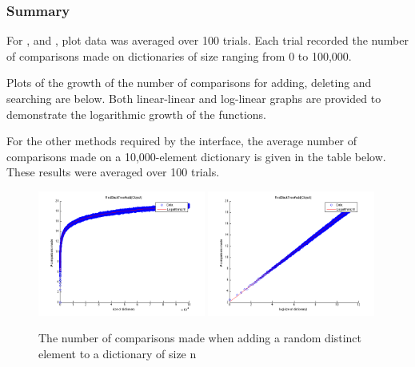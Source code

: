 \subsubsection{Summary}
For ,  and , plot data was averaged over 100 trials. Each trial recorded the number of comparisons made on dictionaries of size ranging from 0 to 100,000.

Plots of the growth of the number of comparisons for adding, deleting and searching are below. Both linear-linear and log-linear graphs are provided to demonstrate the logarithmic growth of the functions.

For the other methods required by the  interface, the average number of comparisons made on a 10,000-element dictionary is given in the table below. These results were averaged over 100 trials.

\begin{figure}[!htbpp]
    \centering
    \includegraphics[width=0.49\textwidth]{resources/add}
    \includegraphics[width=0.49\textwidth]{resources/add_log}
    \caption{The number of comparisons made when adding a random distinct element to a dictionary of size n}

\end{figure}

